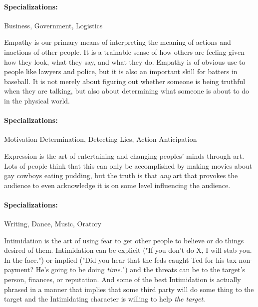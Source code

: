 \paragraph{Specializations:} Business, Government, Logistics


\hspace{\parindent} Empathy is our primary means of interpreting the meaning of actions and inactions of other people. It is a trainable sense of how others are feeling given how they look, what they say, and what they do. Empathy is of obvious use to people like lawyers and police, but it is also an important skill for batters in baseball. It is not merely about figuring out whether someone is being truthful when they are talking, but also about determining what someone is about to do in the physical world.

\paragraph{Specializations:} Motivation Determination, Detecting Lies, Action Anticipation


\hspace{\parindent} Expression is the art of entertaining and changing peoples' minds through art. Lots of people think that this can only be accomplished by making movies about gay cowboys eating pudding, but the truth is that \textit{any} art that provokes the audience to even acknowledge it is on some level influencing the audience. 

\paragraph{Specializations:} Writing, Dance, Music, Oratory


\hspace{\parindent} Intimidation is the art of using fear to get other people to believe or do things desired of them. Intimidation can be explicit ("If you don't do X, I will stab you. In the face.") or implied ("Did you hear that the feds caught Ted for his tax non-payment? He's going to be doing \textit{time}.") and the threats can be to the target's person, finances, or reputation. And some of the best Intimidation is actually phrased in a manner that implies that some third party will do some thing to the target and the Intimidating character is willing to help \textit{the target}.

